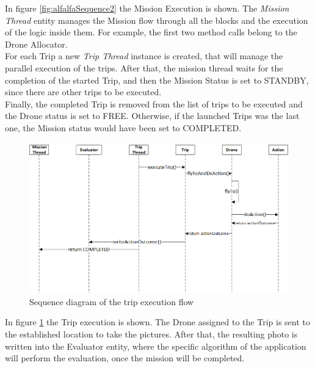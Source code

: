 In figure \ref{fig:alfalfaSequence2} the Mission Execution is shown.
The \textit{Mission Thread} entity manages the Mission flow through all the blocks and the execution of the logic inside them.
For example, the first two method calls belong to the Drone Allocator.
\\
For each Trip a new \textit{Trip Thread} instance is created, that will manage the parallel execution of the trips.
After that, the mission thread waits for the completion of the started Trip, and then the Mission Status is set to STANDBY, since there are other trips to be executed.
\\
Finally, the completed Trip is removed from the list of trips to be executed and the Drone status is set to FREE.
Otherwise, if the launched Trips was the last one, the Mission status would have been set to COMPLETED.
\\

\begin{figure}[h!]
  \centering
  \includegraphics[width=\linewidth]{pictures/Alfalfa_Sequence_TripExecution.png}
  \caption{Sequence diagram of the trip execution flow}
  \label{fig:alfalfaSequence3}
\end{figure}

In figure \ref{fig:alfalfaSequence3} the Trip execution is shown.
The Drone assigned to the Trip is sent to the established location to take the pictures.
After that, the resulting photo is written into the Evaluator entity, where the specific algorithm of the application will perform the evaluation, once the mission will be completed.
\\

